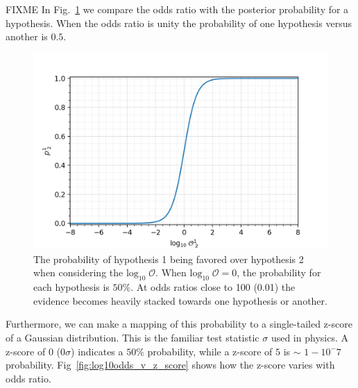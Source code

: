 FIXME
In Fig.~\ref{fig:log10odds_v_probability} we compare the odds ratio with the posterior probability for a hypothesis. When the odds ratio is unity the probability of one hypothesis versus another is $0.5$. 
\begin{figure}
  \includegraphics[width=\textwidth]{figs/chapter5/log10odds_probability.png}
  \caption{The probability of hypothesis 1 being favored over hypothesis 2 when considering the $\mathrm{log}_{10} \; \mathcal{O}$. When $\mathrm{log}_{10} \; \mathcal{O} = 0$, the probability for each hypothesis is $50\%$. At odds ratios close to 100 (0.01) the evidence becomes heavily stacked towards one hypothesis or another.}
  \label{fig:log10odds_v_probability}
\end{figure}
Furthermore, we can make a mapping of this probability to a single-tailed z-score of a Gaussian distribution. This is the familiar test statistic $\sigma$ used in physics. A z-score of $0$ ($0 \sigma$) indicates a $50\%$ probability, while a z-score of $5$ is $\sim$ $1-10^-7$ probability. Fig~\ref{fig:log10odds_v_z_score} shows how the z-score varies with odds ratio.
